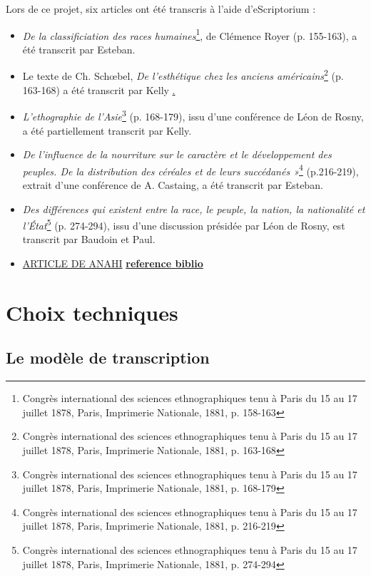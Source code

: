 \documentclass{article}
\begin{document}
	Lors de ce projet, six articles ont été transcris à l'aide d'eScriptorium :
	\begin{itemize}
		\item \textit{De la classificiation des races humaines}\footnote{Congrès international des sciences ethnographiques tenu à Paris du 15 au 17 juillet 1878, Paris, Imprimerie Nationale, 1881, p. 158-163}, de Clémence Royer (p. 155-163), a été transcrit par Esteban.
		\item Le texte de Ch. Schœbel, \textit{De l’esthétique chez les anciens américains}\footnote{Congrès international des sciences ethnographiques tenu à Paris du 15 au 17 juillet 1878, Paris, Imprimerie Nationale, 1881, p. 163-168}  (p. 163-168) a été transcrit par Kelly \underline.
		\item \textit{L'ethographie de l'Asie}\footnote{Congrès international des sciences ethnographiques tenu à Paris du 15 au 17 juillet 1878, Paris, Imprimerie Nationale, 1881, p. 168-179} (p. 168-179), issu d'une conférence de Léon de Rosny, a été partiellement transcrit par Kelly.
		\item \textit{De l'influence de la nourriture sur le caractère et le développement des peuples. De la distribution des céréales et de leurs succédanés »}\footnote{Congrès international des sciences ethnographiques tenu à Paris du 15 au 17 juillet 1878, Paris, Imprimerie Nationale, 1881, p. 216-219} (p.216-219), extrait d'une conférence de A. Castaing, a été transcrit par Esteban.
		\item \textit{Des différences qui existent entre la race, le peuple, la nation, la nationalité et l'État}\footnote{Congrès international des sciences ethnographiques tenu à Paris du 15 au 17 juillet 1878, Paris, Imprimerie Nationale, 1881, p. 274-294} (p. 274-294), issu d'une discussion présidée par Léon de Rosny, est transcrit par Baudoin et Paul.
		\item \underline{ARTICLE DE ANAHI} \underline{\textbf{reference biblio}}
	\end{itemize}
	
	
	
	\section{Choix techniques}
	
	\subsection{Le modèle de transcription}
	
\end{document}
